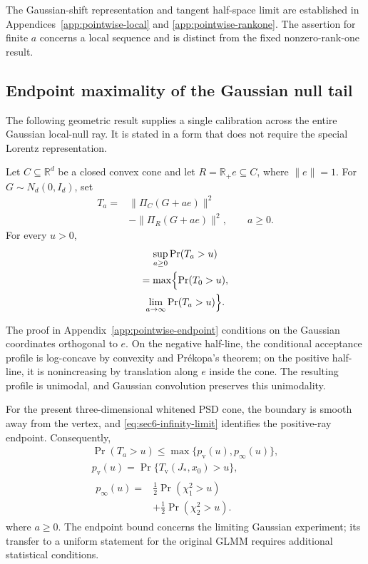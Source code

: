 The Gaussian-shift representation and tangent
half-space limit are established in
Appendices~\ref{app:pointwise-local} and
\ref{app:pointwise-rankone}.
The assertion for finite $a$ concerns a local sequence
and is distinct from the fixed nonzero-rank-one result.

\subsection{Endpoint maximality of the Gaussian null tail}
\label{subsec:pointwise_endpoint}

The following geometric result supplies a single calibration
across the entire Gaussian local-null ray. It is stated in
a form that does not require the special Lorentz
representation.

\begin{theorem}
\label{thm:sec6-endpoint}
Let $C\subseteq\mathbb R^d$ be a closed convex cone and
let $R=\mathbb R_+e\subseteq C$, where $\|e\|=1$.
For $G\sim N_d(0,I_d)$, set
\[
\begin{aligned}
T_a={}&\|\Pi_C(G+ae)\|^2\\
&-\|\Pi_R(G+ae)\|^2,
\qquad a\geq0.
\end{aligned}
\]
For every $u>0$,
\begin{equation}\label{eq:sec6-endpoint-max}
\begin{gathered}
\sup_{a\geq0}\Pr(T_a>u)\\
=\max\Bigl\{
\Pr(T_0>u),\\
\lim_{a\to\infty}\Pr(T_a>u)
\Bigr\}.
\end{gathered}
\end{equation}
\end{theorem}

The proof in Appendix~\ref{app:pointwise-endpoint} conditions on the Gaussian
coordinates orthogonal to $e$. On the negative half-line,
the conditional acceptance profile is log-concave by
convexity and Pr\'ekopa's theorem; on the positive half-line,
it is nonincreasing by translation along $e$ inside the
cone. The resulting profile is unimodal, and Gaussian
convolution preserves this unimodality.

For the present three-dimensional whitened PSD cone,
the boundary is smooth away from the vertex, and
\eqref{eq:sec6-infinity-limit} identifies the positive-ray
endpoint. Consequently,
\begin{equation}\label{eq:sec6-pointwise-tail-bound}
\begin{gathered}
\Pr(T_a>u)\leq
\max\{p_{\mathrm v}(u),p_\infty(u)\},\\
p_{\mathrm v}(u)
=\Pr\{T_{\mathrm v}(J_*,x_0)>u\},\\
\begin{aligned}
p_\infty(u)
={}&\tfrac12\Pr(\chi_1^2>u)\\
&+\tfrac12\Pr(\chi_2^2>u).
\end{aligned}
\end{gathered}
\end{equation}
where $a\geq0$.
The endpoint bound concerns the limiting Gaussian
experiment; its transfer to a uniform statement for the
original GLMM requires additional statistical conditions.

